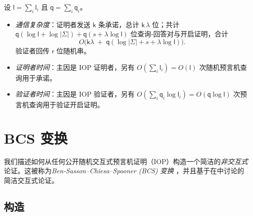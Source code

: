 \documentclass[american,singlepageview]{snargs-book-zh}
\newcommand{\ProtoAlphabet}{\Sigma}
\newcommand{\ProtoRoundComplexity}{\mathsf{k}}
\newcommand{\ProtoProofLength}{\mathsf{l}}
\newcommand{\ProtoQueryComplexity}{\mathsf{q}}
\newcommand{\ProtoRandomnessComplexity}{\mathsf{r}}
\newcommand{\RoundIndex}{i}
\newcommand{\IOPRoundComplexity}{\ProtoRoundComplexity}
\newcommand{\IOPAlphabet}{\ProtoAlphabet}
\newcommand{\IOPProofLength}{\ProtoProofLength}
\newcommand{\IOPRandomnessComplexity}{\ProtoRandomnessComplexity}
\newcommand{\IOPQueryComplexity}{\ProtoQueryComplexity}
\newcommand{\SecurityParameter}{\lambda}
\newcommand{\PrivacyParameter}{s}
\begin{document}
设 $\IOPProofLength=\sum_{\RoundIndex}\IOPProofLength_{\RoundIndex}$ 且
$\IOPQueryComplexity=\sum_{\RoundIndex}\IOPQueryComplexity_{\RoundIndex}$。
\begin{itemize}
  \item \emph{通信复杂度}：证明者发送
    \(\IOPRoundComplexity\) 条承诺，总计
    \(\IOPRoundComplexity\,\SecurityParameter\) 位；共计
    \(\IOPQueryComplexity(\log\IOPProofLength+\log|\IOPAlphabet|)
      +\IOPQueryComplexity(\PrivacyParameter+\SecurityParameter\log\IOPProofLength)\)
    位查询-回答对与开启证明，合计
    \[
      O\bigl(\IOPRoundComplexity\SecurityParameter
      \;+\;\IOPQueryComplexity(\log|\IOPAlphabet|+\PrivacyParameter
      +\SecurityParameter\log\IOPProofLength)\bigr).
    \]
    验证者回传 \(\IOPRandomnessComplexity\) 位随机串。
  \item \emph{证明者时间}：主因是 IOP 证明者，另有
    \(O(\sum_{\RoundIndex}\IOPProofLength_{\RoundIndex})
      =O(\IOPProofLength)\)
    次随机预言机查询用于承诺。
  \item \emph{验证者时间}：主因是 IOP 验证者，另有
    \(O(\sum_{\RoundIndex}\IOPQueryComplexity_{\RoundIndex}
      \log\IOPProofLength_{\RoundIndex})
      =O(\IOPQueryComplexity\log\IOPProofLength)\)
    次预言机查询用于验证开启证明。
\end{itemize}

\chapter{BCS 变换}
\label{chapter:bcs-transformation}

我们描述如何从任何公开随机交互式预言机证明（IOP）构造一个简洁的\emph{非交互式}论证。这被称为\emph{Ben-Sasson--Chiesa--Spooner (BCS) 变换} \cite{BenSassonCS16}，并且基于在中讨论的简洁交互式论证。

\section{构造}
\label{section:bcs-construction}
\end{document}
